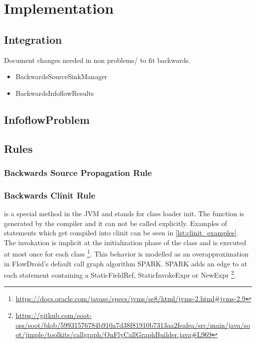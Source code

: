 \documentclass[../draft.tex]{subfiles}
\begin{document}
    \chapter{Implementation}

    \section{Integration}
    Document changes needed in non problems/ to fit backwards.
    \begin{itemize}
        \item BackwardsSourceSinkManager
        \item BackwardsInfoflowResults
    \end{itemize}
    \section{InfoflowProblem}
    \section{Rules}
    \subsection{Backwards Source Propagation Rule}\label{s:sourcerule}
    \subsection{Backwards Clinit Rule}
     is a special method in the JVM and stands for class loader init. The function is generated by the compiler and it can not be called explicitly. Examples of statements which get compiled into clinit can be seen in \autoref{lst:clinit_examples}. The invokation is implicit at the initialization phase of the class and is executed at most once for each class \footnote{\url{https://docs.oracle.com/javase/specs/jvms/se8/html/jvms-2.html\#jvms-2.9}}. 
    This behavior is modelled as an overapproximation in FlowDroid's default call graph algorithm SPARK. SPARK adds an edge to  at each statement containing a StaticFieldRef, StaticInvokeExpr or NewExpr \footnote{\url{https://github.com/soot-oss/soot/blob/59931576784b910a7d38f81910b7313aa2feafea/src/main/java/soot/jimple/toolkits/callgraph/OnFlyCallGraphBuilder.java\#L969}}.
   
\end{document}
